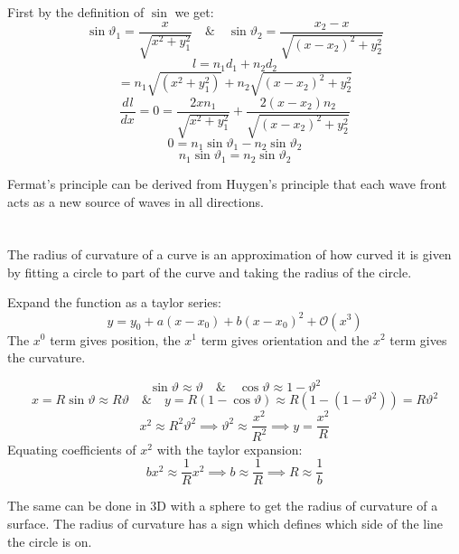 \documentclass{article}
\newcommand{\dv}[3][]{\frac{d^{#1}{#2}}{d{#3}^{#1}}}
\begin{document}
First by the definition of \(\sin\) we get:
\[\sin\vartheta_1=\frac{x}{\sqrt{x^2+y_1^2}}\quad\&\quad\sin\vartheta_2=\frac{x_2-x}{\sqrt{(x-x_2)^2+y_2^2}}\]
\[l=n_1d_1+n_2d_2\]
\[=n_1\sqrt{(x^2+y_1^2)}+n_2\sqrt{(x-x_2)^2+y_2^2}\]
\[\dv lx=0=\frac{2xn_1}{\sqrt{x^2+y_1^2}}+\frac{2(x-x_2)n_2}{\sqrt{(x-x_2)^2+y_2^2}}\]
\[0=n_1\sin\vartheta_1-n_2\sin\vartheta_2\]
\[n_1\sin\vartheta_1=n_2\sin\vartheta_2\]

Fermat's principle can be derived from Huygen's principle that each wave front acts as a new source of waves in all directions.

\section{}

The radius of curvature of a curve is an approximation of how curved it is given by fitting a circle to part of the curve and taking the radius of the circle.

Expand the function as a taylor series:
\[y=y_0+a(x-x_0)+b(x-x_0)^2+\mathcal{O}(x^3)\]
The \(x^0\) term gives position, the \(x^1\) term gives orientation and the \(x^2\) term gives the curvature.

\begin{center}
\end{center}

\[\sin\vartheta\approx\vartheta\quad\&\quad\cos\vartheta\approx1-\vartheta^2\]
\[x=R\sin\vartheta\approx R\vartheta\quad\&\quad y=R(1-\cos\vartheta)\approx R(1-(1-\vartheta^2))=R\vartheta^2\]
\[x^2\approx R^2\vartheta^2\implies\vartheta^2\approx\frac{x^2}{R^2}\implies y=\frac{x^2}{R}\]
Equating coefficients of \(x^2\) with the taylor expansion:
\[bx^2\approx\frac 1Rx^2\implies b\approx\frac 1R\implies R\approx\frac 1b\]

The same can be done in 3D with a sphere to get the radius of curvature of a surface. The radius of curvature has a sign which defines which side of the line the circle is on.
\end{document}
